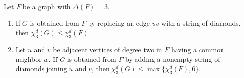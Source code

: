 \begin{proposition}\label{prop:chi3Gleqchi3F}
Let $F$ be a graph with $\Delta(F)=3$.

\begin{enumerate}
    \item If $G$ is obtained from $F$ by replacing an edge $uv$ with a
    string of diamonds, then
    ${\chi_3^d(G)\leq \chi_3^d(F).}$
    \item Let $u$ and $v$ be adjacent vertices of degree two in $F$
    having a common neighbor $w$. If $G$ is obtained from $F$ by adding
    a nonempty string of diamonds joining $u$ and $v$, then
    $
        \chi_3^d(G)\leq \max\{\chi_3^d(F),6\}.
    $
\end{enumerate}
\end{proposition}

